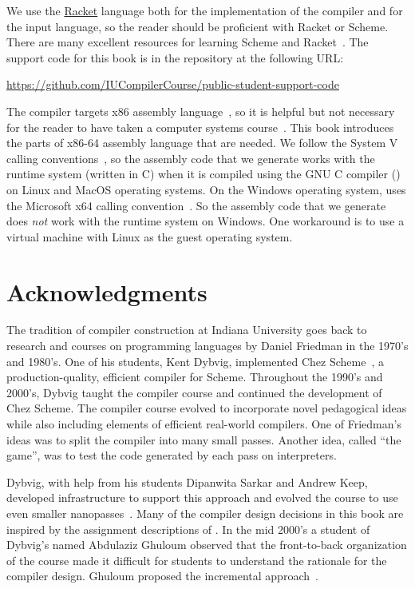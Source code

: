 \documentclass[11pt]{book}
\begin{document}
We use the \href{https://racket-lang.org/}{Racket} language both for
the implementation of the compiler and for the input language, so the
reader should be proficient with Racket or Scheme. There are many
excellent resources for learning Scheme and
Racket~\citep{Dybvig:1987aa,Abelson:1996uq,Friedman:1996aa,Felleisen:2001aa,Felleisen:2013aa,Flatt:2014aa}. The
support code for this book is in the  repository at the
following URL:
\begin{center}\small
  \url{https://github.com/IUCompilerCourse/public-student-support-code}
\end{center}

The compiler targets x86 assembly language~\citep{Intel:2015aa}, so it
is helpful but not necessary for the reader to have taken a computer
systems course~\citep{Bryant:2010aa}. This book introduces the parts
of x86-64 assembly language that are needed.
%
We follow the System V calling
conventions~\citep{Bryant:2005aa,Matz:2013aa}, so the assembly code
that we generate works with the runtime system (written in C) when it
is compiled using the GNU C compiler () on Linux and MacOS
operating systems.
%
On the Windows operating system,  uses the Microsoft x64
calling convention~\citep{Microsoft:2018aa,Microsoft:2020aa}. So the
assembly code that we generate does \emph{not} work with the runtime
system on Windows. One workaround is to use a virtual machine with
Linux as the guest operating system.

\section*{Acknowledgments}

The tradition of compiler construction at Indiana University goes back
to research and courses on programming languages by Daniel Friedman in
the 1970's and 1980's.  One of his students, Kent Dybvig, implemented
Chez Scheme~\citep{Dybvig:2006aa}, a production-quality, efficient
compiler for Scheme.  Throughout the 1990's and 2000's, Dybvig taught
the compiler course and continued the development of Chez Scheme.
%
The compiler course evolved to incorporate novel pedagogical ideas
while also including elements of efficient real-world compilers.  One
of Friedman's ideas was to split the compiler into many small
passes. Another idea, called ``the game'', was to test the code
generated by each pass on interpreters.

Dybvig, with help from his students Dipanwita Sarkar and Andrew Keep,
developed infrastructure to support this approach and evolved the
course to use even smaller
nanopasses~\citep{Sarkar:2004fk,Keep:2012aa}.  Many of the compiler
design decisions in this book are inspired by the assignment
descriptions of \citet{Dybvig:2010aa}. In the mid 2000's a student of
Dybvig's named Abdulaziz Ghuloum observed that the front-to-back
organization of the course made it difficult for students to
understand the rationale for the compiler design. Ghuloum proposed the
incremental approach~\citep{Ghuloum:2006bh}.
\end{document}
